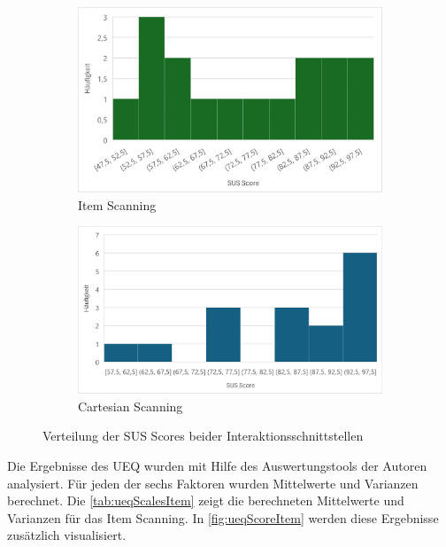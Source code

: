 \begin{figure}
    \centering
    \begin{subfigure} {.5\textwidth}
        \centering
        \includegraphics[width=.95\linewidth]{images/Results/Histogramm-SUS-Item.png}
        \caption{Item Scanning}
        \label{fig:histoSUSItem}
       \end{subfigure}%
       \begin{subfigure}{.5\textwidth}
        \centering
       \includegraphics[width=.98\linewidth]{images/Results/Histogramm-SUS-Cartesian.png}
        \caption{Cartesian Scanning}
        \label{fig:histoSUSCartesian}
       \end{subfigure}
       \caption{Verteilung der SUS Scores beider Interaktionsschnittstellen}
       \label{fig:histoSUS}
\end{figure}


Die Ergebnisse des UEQ wurden mit Hilfe des Auswertungstools der Autoren analysiert. Für jeden der sechs Faktoren wurden Mittelwerte und Varianzen berechnet. Die \autoref{tab:ueqScalesItem} zeigt die berechneten Mittelwerte und Varianzen für das Item Scanning. In \autoref{fig:ueqScoreItem} werden diese Ergebnisse zusätzlich visualisiert.

